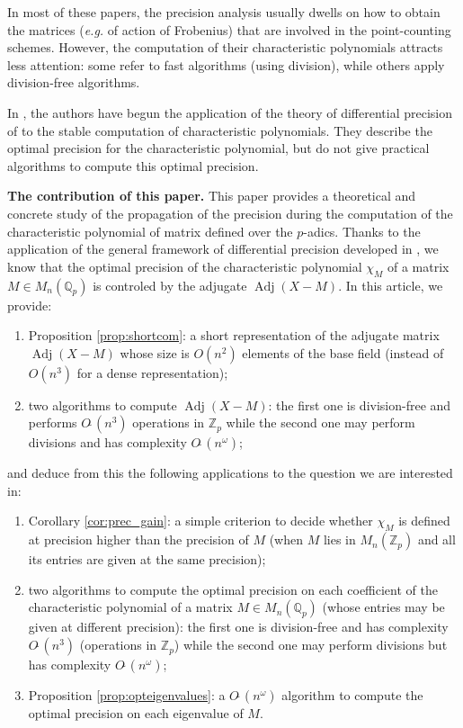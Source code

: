 \documentclass[sigconf]{acmart}
\DeclareMathOperator{\adj}{Adj}
\newcommand{\Z}{\mathbb Z}
\newcommand{\Zp}{\Z_p}
\newcommand{\Q}{\mathbb Q}
\newcommand{\Qp}{\Q_p}
\newcommand{\softO}{O\tilde{~}}
\theoremstyle{definition}
\begin{document}
In most of these papers, the precision analysis usually
dwells on how to obtain the matrices (\textit{e.g.} of action of Frobenius)
that are involved in the point-counting schemes.
However, the computation of their characteristic polynomials 
attracts less attention: some
refer to fast algorithms (using division), while others
apply division-free algorithms.

In \cite{caruso-roe-vaccon:15a}, the authors have begun the application
of the theory of differential precision of \cite{caruso-roe-vaccon:14a}
to the stable computation of characteristic polynomials.
They describe the optimal precision
for the characteristic polynomial, but do not give practical algorithms
to compute this optimal precision.

\medskip

\noindent
{\bf The contribution of this paper.}
This paper provides a theoretical and concrete study of the propagation 
of the precision during the computation of the characteristic polynomial 
of matrix defined over the $p$-adics. Thanks to the application of the 
general framework of differential precision developed in 
\cite{caruso-roe-vaccon:14a,caruso-roe-vaccon:15a}, we know that the 
optimal precision of the characteristic polynomial $\chi_M$ of a matrix 
$M \in M_n(\mathbb{Q}_p)$ is controled by the adjugate $\adj(X{-}M).$
In this article, we provide:
\begin{enumerate}
\renewcommand{\itemsep}{0pt}
\item Proposition \ref{prop:shortcom}: a short representation of
the adjugate matrix $\adj(X{-}M)$ whose size is $O(n^2)$ elements of the base
field (instead of $O(n^3)$ for a dense representation);
\item two algorithms to compute $\adj(X{-}M)$: the first one is 
division-free and performs $\softO(n^3)$ operations in $\Zp$ while 
the second one may perform divisions and has complexity $\softO(n^\omega)$;
\end{enumerate}
and deduce from this the following applications to the question
we are interested in:
\begin{enumerate}
\renewcommand{\itemsep}{0pt}
\setcounter{enumi}{2}
\item Corollary \ref{cor:prec_gain}: a simple criterion to decide 
whether $\chi_M$ is defined at precision higher than the precision of 
$M$ (when $M$ lies in $M_n(\mathbb{Z}_p)$ and all its entries are given 
at the same precision);
\item two algorithms to compute the optimal precision on each 
coefficient of the characteristic polynomial of a matrix $M \in 
M_n(\Qp)$ (whose entries may be given at different precision): the first 
one is division-free and has complexity $\softO(n^3)$ (operations in
$\Zp$) while the second 
one may perform divisions but has complexity $\softO(n^\omega)$;
\item Proposition \ref{prop:opteigenvalues}: a $\softO(n^\omega)$
algorithm to compute the optimal precision on each eigenvalue of $M$.
\end{enumerate}
\end{document}
